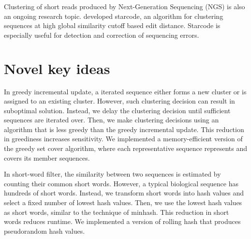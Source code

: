\documentclass[]{article}
\begin{document}
Clustering of short reads produced by Next-Generation Sequencing (NGS) is also an ongoing research topic.
 developed starcode, an algorithm for clustering sequences at high global similarity cutoff based edit distance.
Starcode is especially useful for detection and correction of sequencing errors. 

\section{Novel key ideas}

In greedy incremental update, a iterated sequence either forms a new cluster or is assigned to an existing cluster.
However, such clustering decision can result in suboptimal solution.
Instead, we delay the clustering decision until sufficient sequences are iterated over.
Then, we make clustering decisions using an algorithm that is less greedy than the greedy incremental update.
This reduction in greediness increases sensitivity.
We implemented a memory-efficient version of the greedy set cover algorithm,
	where each representative sequence represents and covers its member sequences.

In short-word filter, the similarity between two sequences is estimated by counting their common short words.
However, a typical biological sequence has hundreds of short words.
Instead, we transform short words into hash values and select a fixed number of lowest hash values.
Then, we use the lowest hash values as short words, similar to the technique of minhash.
This reduction in short words reduces runtime.
We implemented a version of rolling hash that produces pseudorandom hash values.
\end{document}
